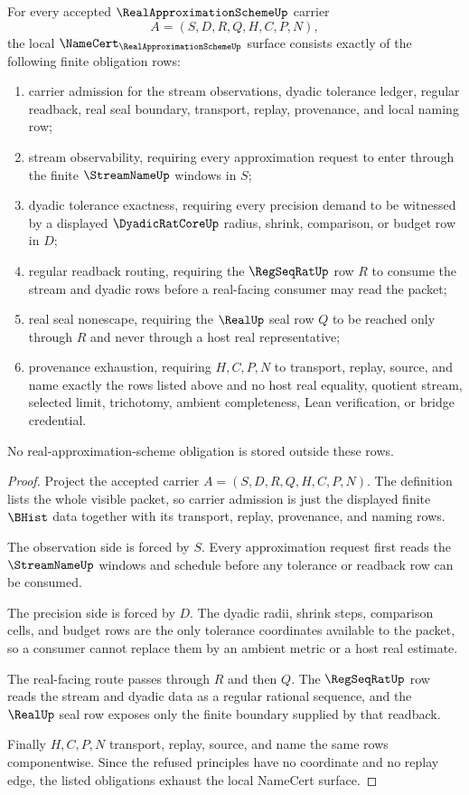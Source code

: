 \begin{theorem}
\label{thm:real-approximation-scheme-namecert-obligations}
For every accepted $\RealApproximationSchemeUp$ carrier
$$
A=(S,D,R,Q,H,C,P,N),
$$
the local $\NameCert_{\RealApproximationSchemeUp}$ surface consists exactly of the following finite obligation rows:
\begin{enumerate}
\item carrier admission for the stream observations, dyadic tolerance ledger, regular readback, real seal boundary, transport, replay, provenance, and local naming row;
\item stream observability, requiring every approximation request to enter through the finite $\StreamNameUp$ windows in $S$;
\item dyadic tolerance exactness, requiring every precision demand to be witnessed by a displayed $\DyadicRatCoreUp$ radius, shrink, comparison, or budget row in $D$;
\item regular readback routing, requiring the $\RegSeqRatUp$ row $R$ to consume the stream and dyadic rows before a real-facing consumer may read the packet;
\item real seal nonescape, requiring the $\RealUp$ seal row $Q$ to be reached only through $R$ and never through a host real representative;
\item provenance exhaustion, requiring $H,C,P,N$ to transport, replay, source, and name exactly the rows listed above and no host real equality, quotient stream, selected limit, trichotomy, ambient completeness, Lean verification, or bridge credential.
\end{enumerate}
No real-approximation-scheme obligation is stored outside these rows.
\end{theorem}

\begin{proof}
Project the accepted carrier $A=(S,D,R,Q,H,C,P,N)$. The definition lists the whole visible packet, so carrier admission is just the displayed finite $\BHist$ data together with its transport, replay, provenance, and naming rows.

The observation side is forced by $S$. Every approximation request first reads the $\StreamNameUp$ windows and schedule before any tolerance or readback row can be consumed.

The precision side is forced by $D$. The dyadic radii, shrink steps, comparison cells, and budget rows are the only tolerance coordinates available to the packet, so a consumer cannot replace them by an ambient metric or a host real estimate.

The real-facing route passes through $R$ and then $Q$. The $\RegSeqRatUp$ row reads the stream and dyadic data as a regular rational sequence, and the $\RealUp$ seal row exposes only the finite boundary supplied by that readback.

Finally $H,C,P,N$ transport, replay, source, and name the same rows componentwise. Since the refused principles have no coordinate and no replay edge, the listed obligations exhaust the local NameCert surface.
\end{proof}


